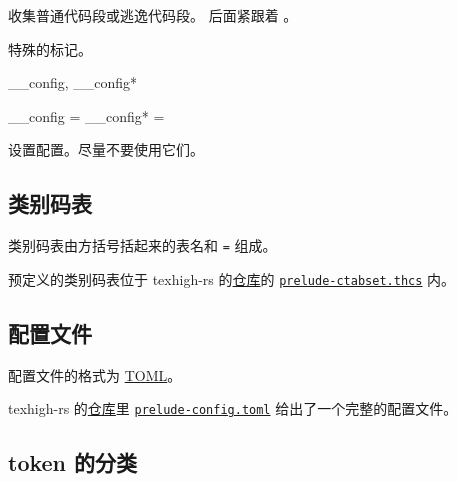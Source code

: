 \documentclass[class=article,openany]{cusdoc}
\begin{document}
\begin{function}{\THCollectRange}
  \begin{syntax}
    \V\THCollectRange {} \V\THrs {} \V\THre
    \V\THCollectRange {} \V\THes {} \V\THee
  \end{syntax}
收集普通代码段或逃逸代码段。 后面紧跟着 。
\end{function}

\begin{function}{\THPASS}
特殊的标记。
\end{function}

\begin{keyval}[path=high]{__config, __config*}
  \begin{syntax}
    __config  =  
    __config* =  
  \end{syntax}
设置配置。尽量不要使用它们。
\end{keyval}

\subsection{类别码表}\label{sec:ctab}

类别码表由方括号括起来的表名和 \texttt{=} 组成。

预定义的类别码表位于 texhigh-rs 的\href{https://github.com/Sophanatprime/texhigh-rs}{仓库}的 \href{https://github.com/Sophanatprime/texhigh-rs/blob/main/src/prelude-ctabset.thcs}{\texttt{prelude-ctabset.thcs}} 内。

\subsection{配置文件}\label{sec:config}

配置文件的格式为 \href{https://toml.io/}{TOML}。

texhigh-rs 的\href{https://github.com/Sophanatprime/texhigh-rs}{仓库}里 \href{https://github.com/Sophanatprime/texhigh-rs/blob/main/src/prelude-config.toml}{\texttt{prelude-config.toml}} 给出了一个完整的配置文件。

\subsection{token 的分类}
\end{document}

